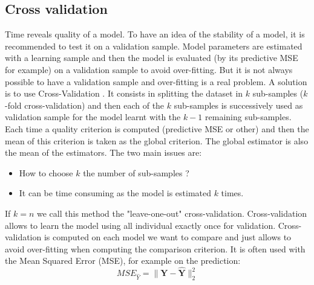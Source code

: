 \documentclass[12pt,a4paper]{report}
\begin{document}
			\subsection{Cross validation}
				
				Time reveals quality of a model. To have an idea of the stability of a model, it is recommended to test it on a validation sample. Model parameters are estimated with a learning sample and then the model is evaluated (by its predictive MSE for example) on a validation sample to avoid over-fitting. But it is not always possible to have a validation sample and over-fitting is a real problem. A solution is to use Cross-Validation \cite{kohavi1995study,arlot2010survey}. It consists in splitting the dataset in $k$ sub-samples ($k$-fold cross-validation) and then each of the $k$ sub-samples is successively used as validation sample for the model learnt with the $k-1$ remaining sub-samples. Each time a quality criterion  is computed (predictive MSE or other) and then the mean of this criterion is taken as the global criterion. The global estimator is also the mean of the estimators. The two main issues are:
				\begin{itemize}
					\item How to choose $k$ the number of sub-samples ?
					\item It can be time consuming as the model is estimated $k$ times.
				\end{itemize}
				If $k=n$ we call this method the "leave-one-out" cross-validation.
				Cross-validation allows to learn the model using all individual exactly once for validation.
				Cross-validation is computed on each model we want to compare and just allows to avoid over-fitting when computing the comparison criterion.
				It is often used with the Mean Squared Error (MSE), for example on the prediction:
				\begin{equation}
					MSE_{\hat{Y}}=\parallel \boldsymbol{Y}-\hat{\boldsymbol{Y}} \parallel^2_2
				\end{equation}
\end{document}
